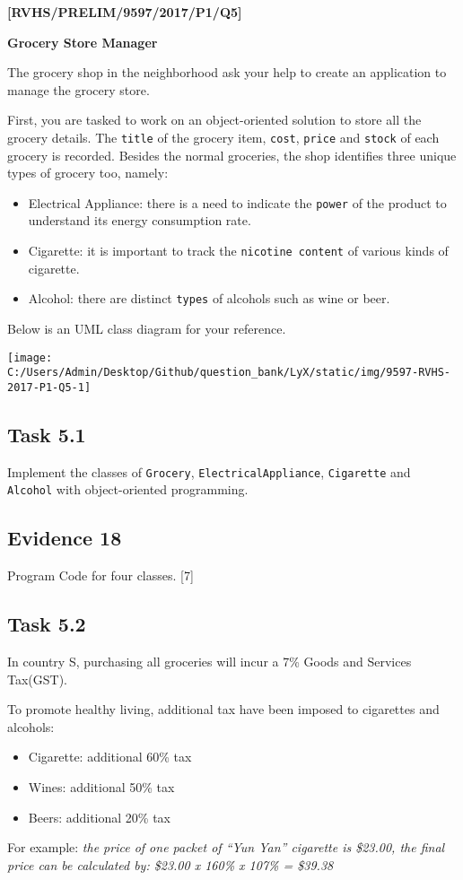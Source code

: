 \item \textbf{{[}RVHS/PRELIM/9597/2017/P1/Q5{]} }

\textbf{Grocery Store Manager }

The grocery shop in the neighborhood ask your help to create an application
to manage the grocery store. 

First, you are tasked to work on an object-oriented solution to store
all the grocery details. The \texttt{title} of the grocery item, \texttt{cost},
\texttt{price} and \texttt{stock} of each grocery is recorded. Besides
the normal groceries, the shop identifies three unique types of grocery
too, namely:
\begin{itemize}
\item Electrical Appliance: there is a need to indicate the \texttt{power}
of the product to understand its energy consumption rate.
\item Cigarette: it is important to track the \texttt{nicotine content}
of various kinds of cigarette.
\item Alcohol: there are distinct \texttt{types} of alcohols such as wine
or beer. 
\end{itemize}
Below is an UML class diagram for your reference. 

\texttt{[image: C:/Users/Admin/Desktop/Github/question\_bank/LyX/static/img/9597-RVHS-2017-P1-Q5-1]}

\subsection*{Task 5.1}

Implement the classes of \texttt{Grocery}, \texttt{ElectricalAppliance},
\texttt{Cigarette} and \texttt{Alcohol} with object-oriented programming.

\subsection*{Evidence 18}

Program Code for four classes. \hfill{}{[}7{]}

\subsection*{Task 5.2 }

In country S, purchasing all groceries will incur a 7\% Goods and
Services Tax(GST). 

To promote healthy living, additional tax have been imposed to cigarettes
and alcohols: 
\begin{itemize}
\item Cigarette: additional 60\% tax 
\item Wines: additional 50\% tax 
\item Beers: additional 20\% tax 
\end{itemize}
For example: \emph{the price of one packet of \textquotedblleft Yun
Yan\textquotedblright{} cigarette is \$23.00, the final price can
be calculated by: \$23.00 x 160\% x 107\% = \$39.38}


